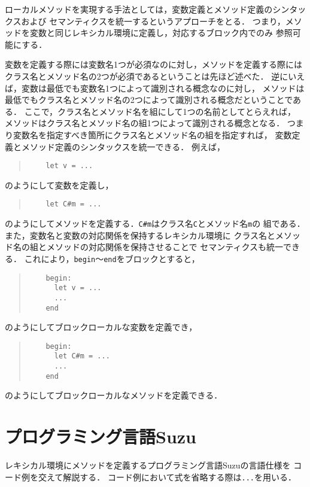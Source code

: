 \documentclass[a4paper,11pt,dvipdfmx]{jreport}
\begin{document}
ローカルメソッドを実現する手法としては，変数定義とメソッド定義のシンタックスおよび
セマンティクスを統一するというアプローチをとる．
つまり，メソッドを変数と同じレキシカル環境に定義し，対応するブロック内でのみ
参照可能にする．

変数を定義する際には変数名1つが必須なのに対し，メソッドを定義する際には
クラス名とメソッド名の2つが必須であるということは先ほど述べた．
逆にいえば，変数は最低でも変数名1つによって識別される概念なのに対し，
メソッドは最低でもクラス名とメソッド名の2つによって識別される概念だということである．
ここで，クラス名とメソッド名を組にして1つの名前としてとらえれば，
メソッドはクラス名とメソッド名の組1つによって識別される概念となる．
つまり変数名を指定すべき箇所にクラス名とメソッド名の組を指定すれば，
変数定義とメソッド定義のシンタックスを統一できる．
例えば，
\begin{quote}
	\begin{verbatim}
	let v = ...
	\end{verbatim}
\end{quote}
のようにして変数を定義し，
\begin{quote}
	\begin{verbatim}
	let C#m = ...
	\end{verbatim}
\end{quote}
のようにしてメソッドを定義する．\verb|C#m|はクラス名\verb|C|とメソッド名\verb|m|の
組である．
また，変数名と変数の対応関係を保持するレキシカル環境に
クラス名とメソッド名の組とメソッドの対応関係を保持させることで
セマンティクスも統一できる．
これにより，\verb|begin|～\verb|end|をブロックとすると，
\begin{quote}
	\begin{verbatim}
	begin:
	  let v = ...
	  ...
	end
	\end{verbatim}
\end{quote}
のようにしてブロックローカルな変数を定義でき，
\begin{quote}
	\begin{verbatim}
	begin:
	  let C#m = ...
	  ...
	end
	\end{verbatim}
\end{quote}
のようにしてブロックローカルなメソッドを定義できる．


\chapter{プログラミング言語Suzu}
\label{chapter:implementation}

レキシカル環境にメソッドを定義するプログラミング言語Suzuの言語仕様を
コード例を交えて解説する．
コード例において式を省略する際は\verb|...|を用いる．
\end{document}
